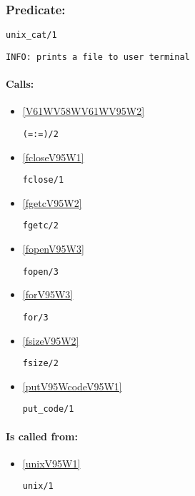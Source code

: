\subsubsection{Predicate:} \label{unixV95WcatV95W1}

\begin{verbatim}
unix_cat/1
\end{verbatim}

{\small \begin{verbatim}
INFO: prints a file to user terminal

\end{verbatim}}
\paragraph{Calls:} 
\begin{itemize}
\item \ref{V61WV58WV61WV95W2} 
\begin{verbatim}
(=:=)/2
\end{verbatim}

\item \ref{fcloseV95W1} 
\begin{verbatim}
fclose/1
\end{verbatim}

\item \ref{fgetcV95W2} 
\begin{verbatim}
fgetc/2
\end{verbatim}

\item \ref{fopenV95W3} 
\begin{verbatim}
fopen/3
\end{verbatim}

\item \ref{forV95W3} 
\begin{verbatim}
for/3
\end{verbatim}

\item \ref{fsizeV95W2} 
\begin{verbatim}
fsize/2
\end{verbatim}

\item \ref{putV95WcodeV95W1} 
\begin{verbatim}
put_code/1
\end{verbatim}

\end{itemize}
\paragraph{Is called from:} 
\begin{itemize}
\item \ref{unixV95W1} 
\begin{verbatim}
unix/1
\end{verbatim}

\end{itemize}


